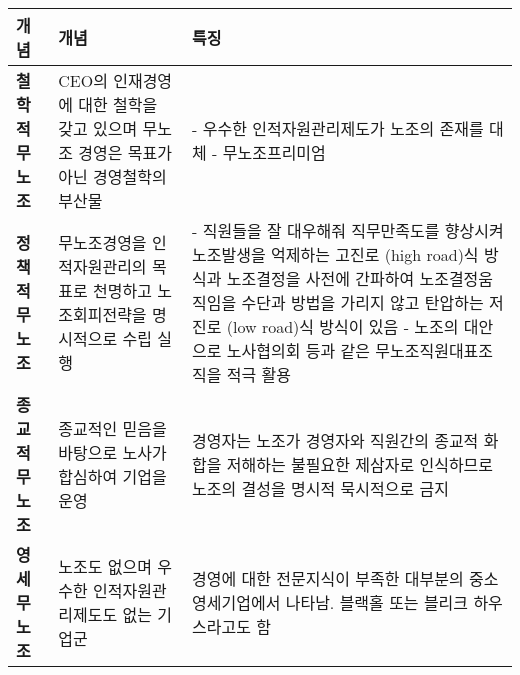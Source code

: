\begin{tabular}{p{3cm} p{6cm} p{9cm}}
        \toprule
        \textbf{개념} & \textbf{개념} & \textbf{특징} \\
        \midrule
        \textbf{철학적 무노조}
            & CEO의 인재경영에 대한 철학을 갖고 있으며 무노조 경영은 목표가 아닌 경영철학의 부산물 
            & - 우수한 인적자원관리제도가 노조의 존재를 대체 \newline - 무노조프리미엄 \\
            \midrule
        \textbf{정책적 무노조}
            & 무노조경영을 인적자원관리의 목표로 천명하고 노조회피전략을 명시적으로 수립 실행
            & - 직원들을 잘 대우해줘 직무만족도를 향상시켜 노조발생을 억제하는 고진로 (high road)식 방식과 노조결정을 사전에 간파하여 노조결정움직임을 수단과 방법을 가리지 않고 탄압하는 저진로 (low road)식 방식이 있음 \newline - 노조의 대안으로 노사협의회 등과 같은 무노조직원대표조직을 적극 활용 \\
            \midrule
        \textbf{종교적 무노조}
            & 종교적인 믿음을 바탕으로 노사가 합심하여 기업을 운영 
            & 경영자는 노조가 경영자와 직원간의 종교적 화합을 저해하는 불필요한 제삼자로 인식하므로 노조의 결성을 명시적 묵시적으로 금지 \\
            \midrule
        \textbf{영세 무노조}
            & 노조도 없으며 우수한 인적자원관리제도도 없는 기업군 
            & 경영에 대한 전문지식이 부족한 대부분의 중소영세기업에서 나타남. 블랙홀 또는 블리크 하우스라고도 함 \\
            \bottomrule
    \end{tabular}
